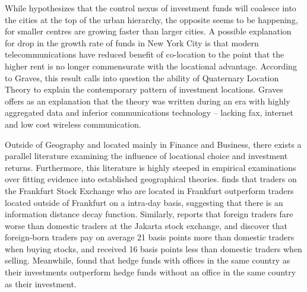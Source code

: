 While \cite{gravesthe1998} hypothesizes that the control nexus of investment funds will coalesce into the cities at the top of the urban hierarchy, the opposite seems to be happening, for smaller centres are growing faster than larger cities.  A possible explanation for drop in the growth rate of funds in New York City is that modern telecommunications have reduced benefit of co-location to the point that the higher rent is no longer commensurate with the locational advantage. According to Graves, this result calls into question the ability of Quaternary Location Theory to explain the contemporary pattern of investment locations. Graves offers as an explanation that the theory was written during an era with highly aggregated data and inferior communications technology -- lacking fax, internet and low cost wireless communication.     
	
Outside of Geography and located mainly in Finance and Business, there exists a parallel literature examining the influence of locational choice and investment returns. Furthermore, this literature is highly steeped in empirical examinations over fitting evidence into established geographical theories. \cite{Hau2001} finds that traders on the Frankfurt Stock Exchange who are located in Frankfurt outperform traders located outside of Frankfurt on a intra-day basis, suggesting that there is an information distance decay function.  Similarly, \cite{Dovak2005} reports that foreign traders fare worse than domestic traders at the Jakarta stock exchange, and	\cite{choedo2004} discover that foreign-born traders pay on average 21 basis points more than domestic traders when buying stocks, and received 16 basis points less than domestic traders when selling. Meanwhile, \cite{teothe2009} found that hedge funds with offices in the same country as their investments outperform hedge funds without an office in the same country as their investment. 
	
